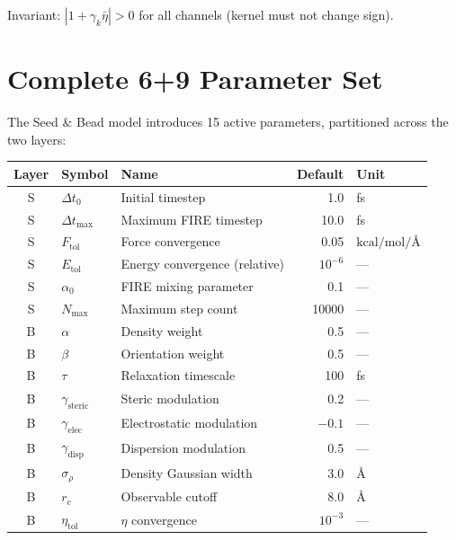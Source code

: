 \documentclass[11pt, a4paper, oneside]{article}
\newcommand{\Ang}{\text{\AA}}
\newcommand{\kcalmol}{\text{kcal/mol}}
\begin{document}
\noindent Invariant: $|1 + \gamma_k \bar{\eta}| > 0$ for all channels
(kernel must not change sign).

\newpage
\section{Complete 6+9 Parameter Set}
\label{sec:parameter-set}

The Seed \& Bead model introduces 15 active parameters, partitioned
across the two layers:

\begin{center}
\begin{tabular}{cllrl}
  \toprule
  \textbf{Layer} & \textbf{Symbol} & \textbf{Name} & \textbf{Default} & \textbf{Unit} \\
  \midrule
  S & $\Delta t_0$          & Initial timestep               & 1.0    & fs \\
  S & $\Delta t_{\max}$     & Maximum FIRE timestep          & 10.0   & fs \\
  S & $F_{\text{tol}}$      & Force convergence              & 0.05   & $\kcalmol/\Ang$ \\
  S & $E_{\text{tol}}$      & Energy convergence (relative)  & $10^{-6}$ & --- \\
  S & $\alpha_0$            & FIRE mixing parameter          & 0.1    & --- \\
  S & $N_{\max}$            & Maximum step count             & 10000  & --- \\
  \midrule
  B & $\alpha$              & Density weight                 & 0.5    & --- \\
  B & $\beta$               & Orientation weight             & 0.5    & --- \\
  B & $\tau$                & Relaxation timescale           & 100    & fs \\
  B & $\gamma_{\text{steric}}$   & Steric modulation         & 0.2    & --- \\
  B & $\gamma_{\text{elec}}$     & Electrostatic modulation  & $-0.1$ & --- \\
  B & $\gamma_{\text{disp}}$     & Dispersion modulation     & 0.5    & --- \\
  B & $\sigma_\rho$              & Density Gaussian width    & 3.0    & $\Ang$ \\
  B & $r_c$                      & Observable cutoff         & 8.0    & $\Ang$ \\
  B & $\eta_{\text{tol}}$        & $\eta$ convergence        & $10^{-3}$ & --- \\
  \bottomrule
\end{tabular}
\end{center}
\end{document}

